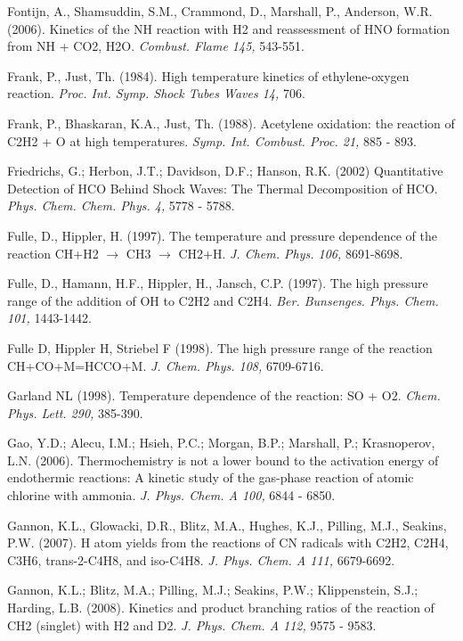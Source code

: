 \documentclass[12pt,landscape]{article}
\newcounter{reaction}
\begin{document}
Fontijn, A., Shamsuddin, S.M., Crammond, D., Marshall, P., Anderson, W.R. (2006).   Kinetics of the NH reaction with H2 and reassessment of HNO formation from NH + CO2, H2O. {\em Combust. Flame 145,} 543-551.

Frank, P., Just, Th. (1984). High temperature kinetics of ethylene-oxygen reaction. {\em  Proc. Int. Symp. Shock Tubes Waves 14,} 706.

Frank, P., Bhaskaran, K.A., Just, Th. (1988). Acetylene oxidation: the reaction of C2H2 + O at high temperatures.  {\em Symp. Int. Combust. Proc. 21,} 885 - 893.

 Friedrichs, G.; Herbon, J.T.; Davidson, D.F.; Hanson, R.K. (2002)   Quantitative Detection of HCO Behind Shock Waves: The Thermal Decomposition of HCO.  {\em Phys. Chem. Chem. Phys. 4,} 5778 - 5788.

Fulle, D., Hippler, H. (1997).  The temperature and pressure dependence of the reaction CH+H2 $\rightarrow$ CH3 $\rightarrow$ CH2+H.  {\em J. Chem. Phys. 106,} 8691-8698.

Fulle, D., Hamann, H.F., Hippler, H., Jansch, C.P.  (1997).  The high pressure range of the addition of OH to C2H2 and C2H4. {\em Ber. Bunsenges. Phys. Chem. 101,} 1443-1442.

 Fulle D, Hippler H, Striebel F (1998). The high pressure range of the reaction CH+CO+M=HCCO+M. {\em J. Chem. Phys. 108,} 6709-6716.

Garland NL (1998). Temperature dependence of the reaction: SO + O2. {\em Chem. Phys. Lett. 290,} 385-390.

Gao, Y.D.; Alecu, I.M.; Hsieh, P.C.; Morgan, B.P.; Marshall, P.; Krasnoperov, L.N. (2006). Thermochemistry is not a lower bound to the activation energy of endothermic reactions: A kinetic study of the gas-phase reaction of atomic chlorine with ammonia.  {\em J. Phys. Chem. A 100,}  6844 - 6850.

Gannon, K.L., Glowacki, D.R., Blitz, M.A., Hughes, K.J., Pilling, M.J., Seakins, P.W. (2007). H atom yields from the reactions of CN radicals with C2H2, C2H4, C3H6, trans-2-C4H8, and iso-C4H8. {\em J. Phys. Chem. A 111,}  6679-6692.

Gannon, K.L.; Blitz, M.A.; Pilling, M.J.; Seakins, P.W.; Klippenstein, S.J.; Harding, L.B. (2008). Kinetics and product branching ratios of the reaction of CH2 (singlet) with H2 and D2.  {\em J. Phys. Chem. A 112,} 9575 - 9583.
\end{document}
